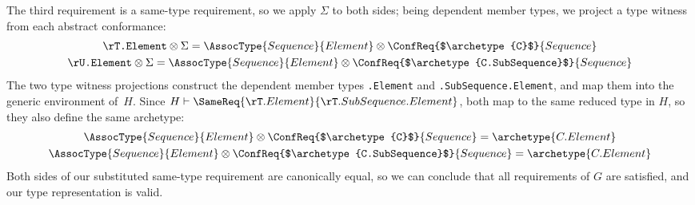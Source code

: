 \documentclass[../generics]{subfiles}
\begin{document}
\begin{example}
The third requirement is a same-type requirement, so we apply $\Sigma$ to both sides; being dependent member types, we project a type witness from each abstract conformance:
\begin{gather*}
\texttt{\rT.Element}\otimes\Sigma=\AssocType{Sequence}{Element}\otimes\ConfReq{$\archetype{C}$}{Sequence}\\
\texttt{\rU.Element}\otimes\Sigma=\AssocType{Sequence}{Element}\otimes\ConfReq{$\archetype{C.SubSequence}$}{Sequence}
\end{gather*}
The two type witness projections construct the dependent member types \texttt{\rT.Element} and \texttt{\rT.SubSequence.Element}, and map them into the generic environment of~$H$. Since $H\vdash\SameReq{\rT.Element}{\rT.SubSequence.Element}$, both map to the same reduced type in $H$, so they also define the same archetype:
\begin{gather*}
\AssocType{Sequence}{Element}\otimes\ConfReq{$\archetype{C}$}{Sequence}=\archetype{C.Element}\\
\AssocType{Sequence}{Element}\otimes\ConfReq{$\archetype{C.SubSequence}$}{Sequence}=\archetype{C.Element}
\end{gather*}
Both sides of our substituted same-type requirement are canonically equal, so we can conclude that all requirements of $G$ are satisfied, and our type representation is valid.
\end{example}
\end{document}
